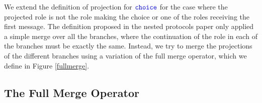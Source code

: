 \documentclass[12pt,twoside]{report}
\begin{document}
We extend the definition of projection for ${\color{blue}\mathtt{choice}}$ for the case where the projected role is not the role making the choice  or one of the roles receiving the first message. The definition proposed in the nested protocols paper only applied a simple merge over all the branches, where the continuation of the role in each of the branches must be exactly the same. Instead, we try to merge the projections of the different branches using a variation of the full merge operator, which we define in Figure \ref{fullmerge}.\\










\subsection{The Full Merge Operator}
\end{document}
